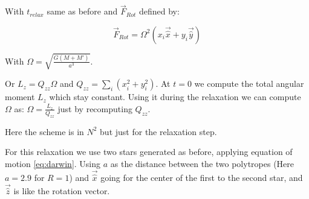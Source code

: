 \documentclass{article}
\begin{document}
With $t_{relax}$ same as before and $\vec{F}_{Rot}$ defined by:

\begin{equation}
\vec{F}_{Rot} = \Omega^2(x_i \vec{\hat{x}}+y_i\vec{\hat{y}})
\end{equation}

With $\Omega = \sqrt{\frac{G(M+M')}{a^3}}$.

Or $L_z = Q_{zz}\Omega$ and $Q_{zz} = \sum_i(x_i^2+y_i^2)$. At $t=0$ we compute the total angular moment $L_z$ which stay constant.
Using it during the relaxation we can compute $\Omega$ as: $\Omega = \frac{L_z}{Q_{zz}}$ just by recomputing $Q_{zz}$.

Here the scheme is in $N^2$ but just for the relaxation step.

For this relaxation we use two stars generated as before, applying equation of motion \ref{eq:darwin}.
Using $a$ as the distance between the two polytropes  (Here $a=2.9$ for $R=1$) and $\vec{\hat{x}}$ going for the center of the first to the second star, and $\vec{\hat{z}}$ is like the rotation vector.

%

\end{document}
